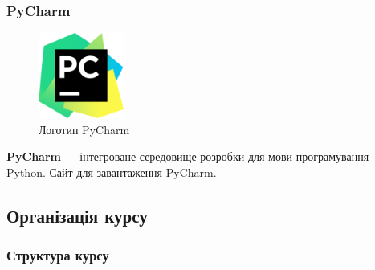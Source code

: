 \begin{frame}
\frametitle{PyCharm}


\begin{figure}
\includegraphics[width=0.25\textwidth]{pictures/pycharm_logo.png}
\caption{Логотип PyCharm}
\label{pycharm_logo}
\end{figure}

\textbf{PyCharm} — інтегроване середовище розробки для мови програмування Python. \href{https://www.jetbrains.com/pycharm/download/}{Сайт} для завантаження PyCharm.
\end{frame}


\subsection{Організація курсу}
\begin{frame}
\frametitle{Структура курсу}
\end{frame}

